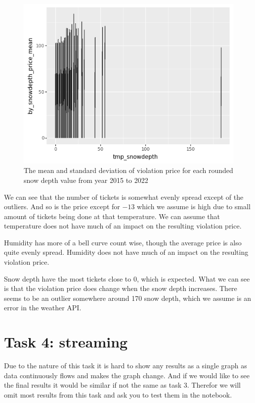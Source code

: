 \documentclass[12pt]{fphw}
\begin{document}
\begin{figure}[h!]
  \label{fig:month_sp}
  \includegraphics[width=1\textwidth]{figures2/Snowdepth_price.png}
  \caption{The mean and standard deviation of violation price for each rounded snow depth value from year 2015 to 2022}
\end{figure}

We can see that the number of tickets is somewhat evenly spread except of the outliers. And so is the price except for $-13$ which we assume is high due to small amount of tickets being done at that temperature. We can assume that temperature does not have much of an impact on the resulting violation price.

Humidity has more of a bell curve count wise, though the average price is also quite evenly spread. Humidity does not have much of an impact on the resulting violation price.

Snow depth have the most tickets close to 0, which is expected. What we can see is that the violation price does change when the snow depth increases. There seems to be an outlier somewhere around 170 snow depth, which we assume is an error in the weather API.


\section{Task 4: streaming}

Due to the nature of this task it is hard to show any results as a single graph as data continuously flows and makes the graph change. And if we would like to see the final results it would be similar if not the same as task 3. Therefor we will omit most results from this task and ask you to test them in the notebook.
\end{document}
